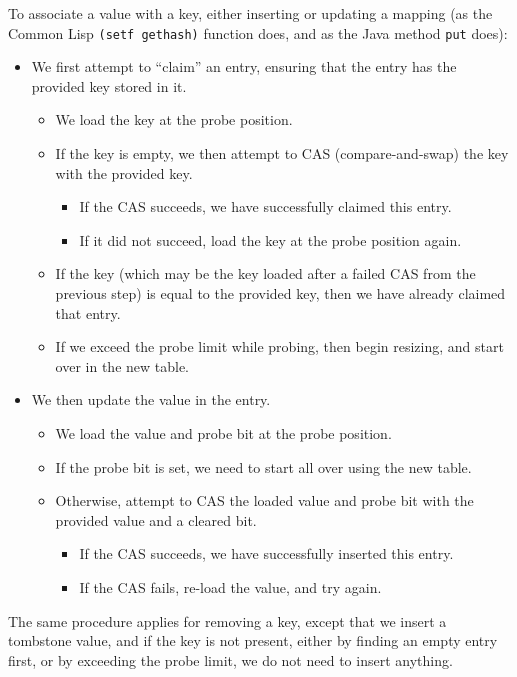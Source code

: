 \documentclass{article}
\begin{document}
To associate a value with a key, either inserting or updating a mapping
(as the Common Lisp \texttt{(setf gethash)} function does, and as the
Java method \texttt{put} does):
\begin{itemize}
\item We first attempt to ``claim'' an entry, ensuring that the entry
  has the provided key stored in it.
  \begin{itemize}
  \item We load the key at the probe position.
  \item If the key is empty, we then attempt to CAS (compare-and-swap)
    the key with the provided key.
    \begin{itemize}
    \item If the CAS succeeds, we have successfully claimed this
      entry.
    \item If it did not succeed, load the key at the probe position
      again.
    \end{itemize}
  \item If the key (which may be the key loaded after a failed CAS
    from the previous step) is equal to the provided key, then we have
    already claimed that entry.
  \item If we exceed the probe limit while probing, then begin
    resizing, and start over in the new table.
  \end{itemize}
\item We then update the value in the entry.
  \begin{itemize}
  \item We load the value and probe bit at the probe position.
  \item If the probe bit is set, we need to start all over using the
    new table.
  \item Otherwise, attempt to CAS the loaded value and probe bit with
    the provided value and a cleared bit.
    \begin{itemize}
    \item If the CAS succeeds, we have successfully inserted this entry.
    \item If the CAS fails, re-load the value, and try again.
    \end{itemize}
  \end{itemize}
\end{itemize}


The same procedure applies for removing a key, except that we insert a
tombstone value, and if the key is not present, either by finding an
empty entry first, or by exceeding the probe limit, we do not need to
insert anything.
\end{document}

